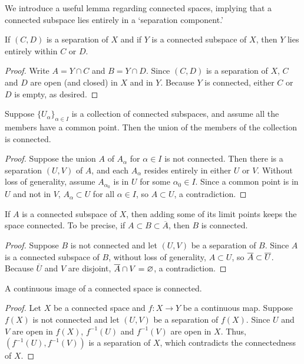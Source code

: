 We introduce a useful lemma regarding connected spaces, implying that a connected subspace lies entirely in a `separation component.'
\begin{lem}
    If $(C, D)$ is a separation of $X$ and if $Y$ is a connected subspace of $X$, then $Y$ lies entirely within $C$ or $D$.
\end{lem}
\begin{proof}
    Write $A=Y\cap C$ and $B=Y\cap D$.
    Since $(C, D)$ is a separation of $X$, $C$ and $D$ are open (and closed) in $X$ and in $Y$.
    Because $Y$ is connected, either $C$ or $D$ is empty, as desired.
\end{proof}

\begin{prop}\label{nonempty intersection keeps connectedness}
    Suppose $\{U_\alpha\}_{\alpha\in I}$ is a collection of connected subspaces, and assume all the members have a common point.
    Then the union of the members of the collection is connected.
\end{prop}
\begin{proof}
    Suppose the union $A$ of $A_\alpha$ for $\alpha\in I$ is not connected.
    Then there is a separation $(U, V)$ of $A$, and each $A_\alpha$ resides entirely in either $U$ or $V$.
    Without loss of generality, assume $A_{\alpha_0}$ is in $U$ for some $\alpha_0\in I$.
    Since a common point is in $U$ and not in $V$, $A_\alpha\subset U$ for all $\alpha\in I$, so $A\subset U$, a contradiction.
\end{proof}

\begin{prop}\label{adding limit points keeps connectedness}
    If $A$ is a connected subspace of $X$, then adding some of its limit points keeps the space connected.
    To be precise, if $A\subset B\subset\overline{A}$, then $B$ is connected.
\end{prop}
\begin{proof}
    Suppose $B$ is not connected and let $(U, V)$ be a separation of $B$.
    Since $A$ is a connected subspace of $B$, without loss of generality, $A\subset U$, so $\overline{A}\subset \overline{U}$.
    Because $\overline{U}$ and $V$ are disjoint, $\overline{A}\cap V=\varnothing$, a contradiction.
\end{proof}

\begin{thm}\label{continuity keeps connectedness}
    A continuous image of a connected space is connected.
\end{thm}
\begin{proof}
    Let $X$ be a connected space and $f: X\rightarrow Y$ be a continuous map.
    Suppose $f(X)$ is not connected and let $(U, V)$ be a separation of $f(X)$.
    Since $U$ and $V$ are open in $f(X)$, $f^{-1}(U)$ and $f^{-1}(V)$ are open in $X$.
    Thus, $(f^{-1}(U), f^{-1}(V))$ is a separation of $X$, which contradicts the connectedness of $X$.
\end{proof}


